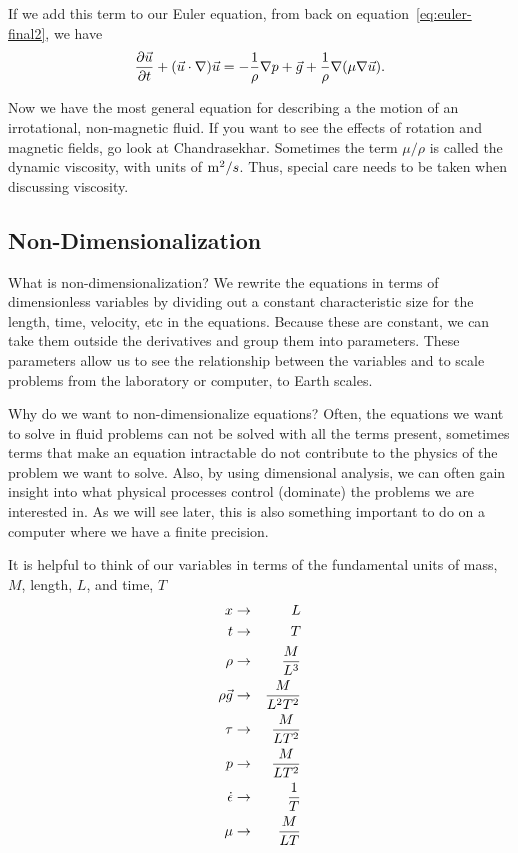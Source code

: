 \documentclass[12pt,twoside]{article}
\begin{document}
If we add this term to our Euler equation, from back on
equation~\ref{eq:euler-final2}, we have
\begin{equation}    
{{\partial \vec u} \over {\partial t}} + ( \vec u \cdot
\nabla ) \vec u =  - {1\over\rho}\nabla p + \vec g + {1\over\rho}
\nabla ( \mu \nabla \vec u).
\label{eq:navier-stokes1}
\end{equation}

Now we have the most general equation for describing a the motion of an
irrotational, non-magnetic fluid.   If you want to see the effects of rotation
and magnetic fields, go look at Chandrasekhar.  Sometimes the term $\mu/\rho$ is
called the dynamic viscosity, with units of ${\rm m^2}/ s$.   Thus, special care
needs to be taken when discussing viscosity.

\vfill\eject

\subsection{Non-Dimensionalization}

What is non-dimensionalization?   We rewrite the equations in terms of
dimensionless variables by dividing out a constant characteristic size for the
length, time, velocity, etc in the equations.  Because these are constant, we
can take them outside the derivatives and group them into parameters.   These
parameters allow us to see the relationship between the variables and to scale
problems from the laboratory or computer, to Earth scales.  

Why do we want to non-dimensionalize equations?   Often,
the equations we want to solve in fluid problems can not be solved with all the
terms present,  sometimes terms that make an equation intractable do not
contribute to the physics of the problem we want to solve.   Also, by using
dimensional analysis, we can often gain insight into what physical processes
control (dominate) the problems we are interested in.   As we will see later,
this is also something important to do on a computer where we have a finite
precision.

It is helpful to think of our variables in terms of the fundamental units of
mass, $M$, length, $L$, and time, $T$
\begin{eqnarray*}
x & \rightarrow & L \\
t & \rightarrow & T \\
\rho & \rightarrow & {M\over L^3} \\
\rho \vec g & \rightarrow & {{M}\over{L^2 T^2}} \\
\tau & \rightarrow & {M\over {LT^2}} \\
p & \rightarrow & {M\over {LT^2}} \\
\dot \epsilon & \rightarrow & {1\over T} \\
\mu & \rightarrow & {{M}\over{LT}} 
\end{eqnarray*}
\end{document}

